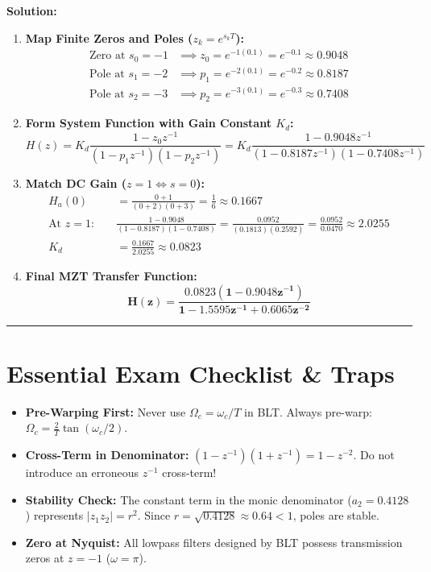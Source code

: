 \documentclass[11pt,a4paper]{article}
\begin{document}
\vspace{1mm}
\noindent\textbf{Solution:}
\begin{enumerate}
    \item \textbf{Map Finite Zeros and Poles ($z_k = e^{s_k T}$):}
    \begin{align}
    \text{Zero at } s_0 = -1 &\implies z_0 = e^{-1(0.1)} = e^{-0.1} \approx \mathbf{0.9048} \nonumber \\
    \text{Pole at } s_1 = -2 &\implies p_1 = e^{-2(0.1)} = e^{-0.2} \approx \mathbf{0.8187} \nonumber \\
    \text{Pole at } s_2 = -3 &\implies p_2 = e^{-3(0.1)} = e^{-0.3} \approx \mathbf{0.7408}
    \end{align}
    \item \textbf{Form System Function with Gain Constant $K_d$:}
    \begin{equation}
    H(z) = K_d \frac{1 - z_0 z^{-1}}{(1 - p_1 z^{-1})(1 - p_2 z^{-1})} = K_d \frac{1 - 0.9048 z^{-1}}{(1 - 0.8187 z^{-1})(1 - 0.7408 z^{-1})}
    \end{equation}
    \item \textbf{Match DC Gain ($z = 1 \iff s = 0$):}
    \begin{align}
    H_a(0) &= \frac{0 + 1}{(0 + 2)(0 + 3)} = \frac{1}{6} \approx \mathbf{0.1667} \nonumber \\
    \text{At } z=1: \quad &\frac{1 - 0.9048}{(1 - 0.8187)(1 - 0.7408)} = \frac{0.0952}{(0.1813)(0.2592)} = \frac{0.0952}{0.0470} \approx \mathbf{2.0255} \nonumber \\
    K_d &= \frac{0.1667}{2.0255} \approx \mathbf{0.0823}
    \end{align}
    \item \textbf{Final MZT Transfer Function:}
    \begin{equation}
    \mathbf{H(z) = \frac{0.0823 (1 - 0.9048 z^{-1})}{1 - 1.5595 z^{-1} + 0.6065 z^{-2}}}
    \end{equation}
\end{enumerate}

\noindent\rule{\textwidth}{0.5pt}

\section{Essential Exam Checklist \& Traps}
\begin{itemize}
    \item[$\square$] \textbf{Pre-Warping First:} Never use $\Omega_c = \omega_c/T$ in BLT. Always pre-warp: $\Omega_c = \frac{2}{T}\tan(\omega_c/2)$.
    \item[$\square$] \textbf{Cross-Term in Denominator:} $(1 - z^{-1})(1 + z^{-1}) = 1 - z^{-2}$. Do not introduce an erroneous $z^{-1}$ cross-term!
    \item[$\square$] \textbf{Stability Check:} The constant term in the monic denominator ($a_2 = 0.4128$) represents $|z_1 z_2| = r^2$. Since $r = \sqrt{0.4128} \approx 0.64 < 1$, poles are stable.
    \item[$\square$] \textbf{Zero at Nyquist:} All lowpass filters designed by BLT possess transmission zeros at $z = -1$ ($\omega = \pi$).
\end{itemize}
\end{document}
